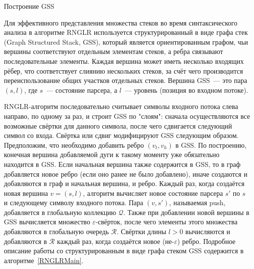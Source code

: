\begin{listing}[!ht]
\begin{algorithmic}[1]
\caption{Построение GSS}
\label{RNGLRMain}
  \EndIf
\EndFunction
{}
    \EndIf
  \EndIf
\EndFunction
\end{algorithmic}
\end{listing}

Для эффективного представления множества стеков во время синтаксического анализа в алгоритме RNGLR используется структурированный в виде графа стек (Graph Structured Stack, GSS), 
который является ориентированным графом, чьи вершины соответствуют отдельным элементам стеков, а ребра связывают последовательные элементы. Каждая вершина может иметь несколько входящих рёбер, 
что соответствует слиянию нескольких стеков, за счёт чего производится переиспользование общих участков отдельных стеков. Вершина GSS~--- это пара $(s,l)$, где $s$~--- состояние парсера, а $l$~--- уровень (позиция во входном потоке).

RNGLR-алгоритм последовательно считывает символы входного потока слева направо, по одному за раз, и строит GSS по "слоям": сначала осуществляются все возможные свёртки для данного символа, после чего сдвигается следующий символ со входа. Свёртка или сдвиг модифицируют GSS следующим образом. Предположим, что необходимо добавить ребро $(v_t,v_h)$ в GSS. По построению, конечная вершина добавляемой дуги к такому моменту уже обязательно находится в GSS. Если начальная вершина также содержится в GSS, то в граф добавляется новое ребро (если оно ранее не было добавлено), иначе создаются и добавляются в граф и начальная вершина, и ребро. Каждый раз, когда создаётся новая вершина $v=(s,l)$, алгоритм вычисляет новое состояние парсера $s'$ по $s$ и следующему символу входного потока. Пара $(v,s')$, называемая push, добавляется в глобальную коллекцию $\mathcal{Q}$. Также при добавлении новой вершины в GSS вычисляется множество $\varepsilon$-свёрток, после чего элементы этого множества добавляются в глобальную очередь $\mathcal{R}$. Свёртки длины $l>0$ вычисляются и добавляются в $\mathcal{R}$ каждый раз, когда создаётся новое (не-$\varepsilon$) ребро. Подробное описание работы со структурированным в виде графа стеком GSS содержится в алгоритме~\ref{RNGLRMain}.

